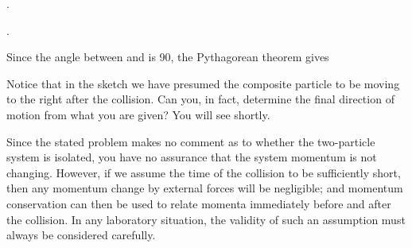 {{\begin{two-digit-list}
\item [4.] .

\item [5.] .

\item [6.] 

\item [7.] Since the angle between  and  is {90\degrees},
           the Pythagorean theorem gives


\item [8.] 

\item [9.] 

\item [10.] \noindent{}

\item [11.] \noindent\newline{}
           Notice that in the sketch we have presumed the composite particle to
           be moving to the right after the collision.
           Can you, in fact, determine the final direction of motion from what
           you are given?
           You will see shortly.

\item [12.] Since the stated problem makes no comment as to whether the
           two-particle system is isolated, you have no assurance that the
           system momentum is not changing.
           However, if we assume the time of the collision to be sufficiently
           short, then any momentum change by external forces will be
           negligible; and momentum conservation can then be used to relate
           momenta immediately before and after the collision.
           In any laboratory situation, the validity of such an assumption
           must always be considered carefully.


\end{two-digit-list}}}
